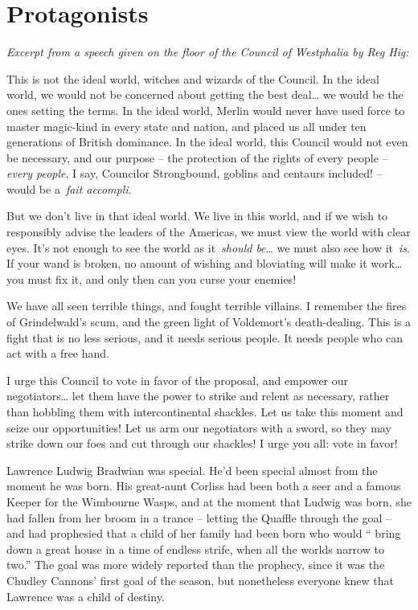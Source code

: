 \hypertarget{protagonists}{%
\chapter{Protagonists}\label{protagonists}}

\emph{Excerpt from a speech given on the floor of the Council of
Westphalia by Reg Hig:}

This is not the ideal world, witches and wizards of the Council. In the
ideal world, we would not be concerned about getting the best
deal\ldots{} we would be the ones setting the terms. In the ideal world,
Merlin would never have used force to master magic-kind in every state
and nation, and placed us all under ten generations of British
dominance. In the ideal world, this Council would not even be necessary,
and our purpose -- the protection of the rights of every people --
\emph{every people}, I say, Councilor Strongbound, goblins and centaurs
included! -- would be a~\emph{fait accompli}.

But we don't live in that ideal world. We live in this world, and if we
wish to responsibly advise the leaders of the Americas, we must view the
world with clear eyes. It's not enough to see the world as
it~\emph{should be}\ldots{} we must also see how it~\emph{is}. If your
wand is broken, no amount of wishing and bloviating will make it
work\ldots{} you must fix it, and only then can you curse your enemies!

We have all seen terrible things, and fought terrible villains. I
remember the fires of Grindelwald's scum, and the green light of
Voldemort's death-dealing. This is a fight that is no less serious, and
it needs serious people. It needs people who can act with a free hand.

I urge this Council to vote in favor of the proposal, and empower our
negotiators\ldots{} let them have the power to strike and relent as
necessary, rather than hobbling them with intercontinental shackles. Let
us take this moment and seize our opportunities! Let us arm our
negotiators with a sword, so they may strike down our foes and cut
through our shackles! I urge you all: vote in favor!

\mybreak

Lawrence Ludwig Bradwian was special. He'd been special almost from the
moment he was born. His great-aunt Corliss had been both a seer and a
famous Keeper for the Wimbourne Wasps, and at the moment that Ludwig was
born, she had fallen from her broom in a trance -- letting the Quaffle
through the goal -- and had prophesied that a child of her family had
been born who would `` bring down a great house in a time of endless
strife, when all the worlds narrow to two.'' The goal was more widely
reported than the prophecy, since it was the Chudley Cannons' first goal
of the season, but nonetheless everyone knew that Lawrence was a child
of destiny.

